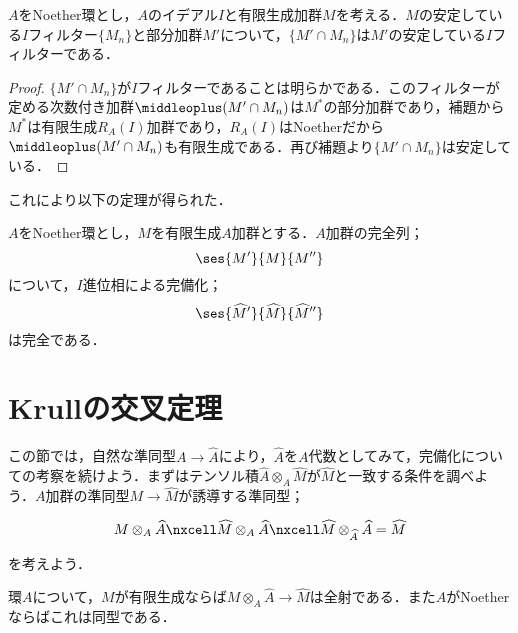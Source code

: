 \begin{prop}\label{prop:Artin--Reesの補題}
	$A$をNoether環とし，$A$のイデアル$I$と有限生成加群$M$を考える．$M$の安定している$I$フィルター$\{M_n\}$と部分加群$M'$について，$\{M'\cap M_n\}$は$M'$の安定している$I$フィルターである．
\end{prop}

\begin{proof}
	$\{M'\cap M_n\}$が$I$フィルターであることは明らかである．このフィルターが定める次数付き加群$\middleoplus (M'\cap M_n)$は$M^\ast$の部分加群であり，補題から$M^\ast$は有限生成$R_A(I)$加群であり，$R_A(I)$はNoetherだから$\middleoplus (M'\cap M_n)$も有限生成である．再び補題より$\{M'\cap M_n\}$は安定している．
\end{proof}

これにより以下の定理が得られた．

\begin{thm}
	$A$をNoether環とし，$M$を有限生成$A$加群とする．$A$加群の完全列；
	\[\ses{M'}{M}{M''}\]
	について，$I$進位相による完備化；
	\[\ses{\widehat{M}'}{\widehat{M}}{\widehat{M}''}\]
	は完全である．
\end{thm}

\section{Krullの交叉定理}

この節では，自然な準同型$A\to\widehat{A}$により，$\widehat{A}$を$A$代数としてみて，完備化についての考察を続けよう．まずはテンソル積$\widehat{A}\otimes_A \widehat{M}$が$\widehat{M}$と一致する条件を調べよう．$A$加群の準同型$M\to\widehat{M}$が誘導する準同型；
\[\begin{tikzcd}
	M\otimes_A 
	\widehat{A}\nxcell\widehat{M}\otimes_A\widehat{A}\nxcell\widehat{M}\otimes_{\widehat{A}}\widehat{A}=\widehat{M}
\end{tikzcd}\]
を考えよう．

\begin{prop}\label{prop:有限生成なら完備化は係数拡大}
	環$A$について，$M$が有限生成ならば$M\otimes_A \widehat{A}\to\widehat{M}$は全射である．また$A$がNoetherならばこれは同型である．
\end{prop}


